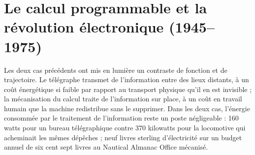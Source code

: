 
\section{Le calcul programmable et la révolution électronique (1945--1975)}\label{sec:computing}

Les deux cas précédents ont mis en lumière un contraste de fonction et de trajectoire. Le télégraphe transmet de l'information entre des lieux distants, à un coût énergétique si faible par rapport au transport physique qu'il en est invisible ; la mécanisation du calcul traite de l'information sur place, à un coût en travail humain que la machine redistribue sans le supprimer. Dans les deux cas, l'énergie consommée par le traitement de l'information reste un poste négligeable : 160 watts pour un bureau télégraphique contre 370 kilowatts pour la locomotive qui acheminait les mêmes dépêches ; neuf livres sterling d'électricité sur un budget annuel de six cent sept livres au Nautical Almanac Office mécanisé.

